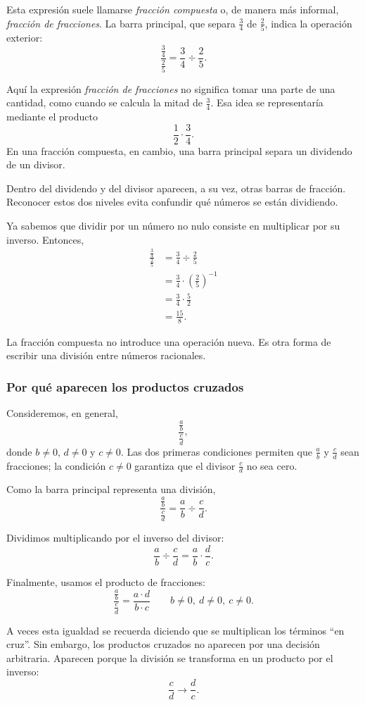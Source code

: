 Esta expresión suele llamarse \emph{fracción compuesta} o, de manera más
informal, \emph{fracción de fracciones}. La barra principal, que separa
\(\frac34\) de \(\frac25\), indica la operación exterior:
\[
\frac{\frac34}{\frac25}
=
\frac34\div\frac25.
\]

Aquí la expresión \emph{fracción de fracciones} no significa tomar una parte
de una cantidad, como cuando se calcula la mitad de \(\frac34\). Esa idea se
representaría mediante el producto
\[
\frac12\cdot\frac34.
\]
En una fracción compuesta, en cambio, una barra principal separa un dividendo
de un divisor.

Dentro del dividendo y del divisor aparecen, a su vez, otras barras de fracción.
Reconocer estos dos niveles evita confundir qué números se están dividiendo.

Ya sabemos que dividir por un número no nulo consiste en multiplicar por su
inverso. Entonces,
\begin{align*}
\frac{\frac34}{\frac25}
&=
\frac34\div\frac25\\
&=
\frac34\cdot\left(\frac25\right)^{-1}\\
&=
\frac34\cdot\frac52\\
&=
\frac{15}{8}.
\end{align*}

La fracción compuesta no introduce una operación nueva. Es otra forma de
escribir una división entre números racionales.

\subsubsection{Por qué aparecen los productos cruzados}

Consideremos, en general,
\[
\frac{\frac ab}{\frac cd},
\]
donde \(b\ne0\), \(d\ne0\) y \(c\ne0\). Las dos primeras condiciones permiten
que \(\frac ab\) y \(\frac cd\) sean fracciones; la condición \(c\ne0\)
garantiza que el divisor \(\frac cd\) no sea cero.

Como la barra principal representa una división,
\[
\frac{\frac ab}{\frac cd}
=
\frac ab\div\frac cd.
\]

Dividimos multiplicando por el inverso del divisor:
\[
\frac ab\div\frac cd
=
\frac ab\cdot\frac dc.
\]

Finalmente, usamos el producto de fracciones:
\[
\boxed{
\frac{\frac ab}{\frac cd}
=
\frac{a\cdot d}{b\cdot c}
}
\qquad
b\ne0,\ d\ne0,\ c\ne0.
\]

A veces esta igualdad se recuerda diciendo que se multiplican los términos
``en cruz''. Sin embargo, los productos cruzados no aparecen por una decisión
arbitraria. Aparecen porque la división se transforma en un producto por el
inverso:
\[
\frac cd
\longrightarrow
\frac dc.
\]

